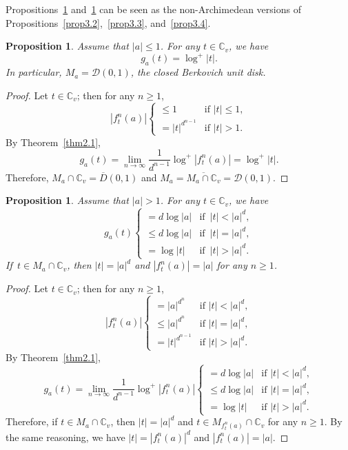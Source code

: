 \documentclass[10pt,a4paper]{amsart}
\numberwithin{equation}{section}
\theoremstyle{plain}
\newtheorem{prop}[thm]{Proposition}
\theoremstyle{definition}
\theoremstyle{remark}
\newcommand{\C}{\mathbb C}
\begin{document}
Propositions~\ref{prop3.8} and~\ref{prop3.9} can be seen as the
non-Archimedean versions of Propositions~\ref{prop3.2},~\ref{prop3.3},
and~\ref{prop3.4}.

\begin{prop}\label{prop3.8}
  Assume that $|a|\leq1$. For any $t\in\C_{v}$,
we have
\[
g_{a}(t)=\log^{+}|t|.
\]
In particular, $M_{a}=\mathcal{D}(0,1)$, the closed Berkovich unit
disk.
\end{prop}

\begin{proof}
Let $t\in\C_{v}$; then for any $n\geq1$,
\[
|f_{t}^{n}(a)|\begin{cases}
\leq1 & \text{if }|t|\leq1,\\
=|t|^{d^{n-1}} & \text{if }|t|>1.
\end{cases}
\]
By Theorem~\ref{thm2.1},
\[
g_{a}(t)=\lim_{n\to\infty}\frac{1}{d^{n-1}}\log^{+}|f_{t}^{n}(a)|=\log^{+}|t|.
\]
Therefore, $M_{a}\cap\C_{v}=\overline{D}(0,1)$ and $M_{a}=\overline{M_{a}\cap\C_{v}}=\mathcal{D}(0,1)$.
\end{proof}

\begin{prop}\label{prop3.9}
Assume that $|a|>1$. For any $t\in\C_{v}$, we have
\[
g_{a}(t)\begin{cases}
=d\log|a| & \text{if }\,|t|<|a|^{d},\\
\leq d\log|a| & \text{if }\,|t|=|a|^{d},\\
=\log|t| & \text{if }\,|t|>|a|^{d}.
\end{cases}
\]
If\, $t\in M_{a}\cap\C_{v}$, then $|t|=|a|^{d}$ and $|f_{t}^{n}(a)|=|a|$
for any $n\geq1$.
\end{prop}

\begin{proof}
Let $t\in\C_{v}$; then for any $n\geq1$,
\[
|f_{t}^{n}(a)|\begin{cases}
=|a|^{d^{n}} & \text{if }|t|<|a|^{d},\\
\leq|a|^{d^{n}} & \text{if }|t|=|a|^{d},\\
=|t|^{d^{n-1}} & \text{if }|t|>|a|^{d}.
\end{cases}
\]
By Theorem~\ref{thm2.1},
\[
g_{a}(t)=\lim_{n\to\infty}\frac{1}{d^{n-1}}\log^{+}|f_{t}^{n}(a)|\begin{cases}
=d\log|a| & \text{if }|t|<|a|^{d},\\
\leq d\log|a| & \text{if }|t|=|a|^{d},\\
=\log|t| & \text{if }|t|>|a|^{d}.
\end{cases}
\]
Therefore, if $t\in M_{a}\cap\C_{v}$, then $|t|=|a|^{d}$
and $t\in M_{f_{t}^{n}(a)}\cap\C_{v}$ for any $n\geq1$.
By the same reasoning, we have $|t|=|f_{t}^{n}(a)|^{d}$ and $|f_{t}^{n}(a)|=|a|$.
\end{proof}
\end{document}
